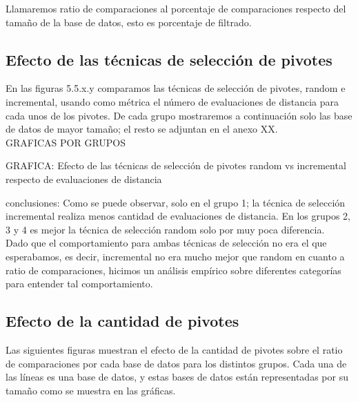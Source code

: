Llamaremos ratio de comparaciones al porcentaje de comparaciones respecto del tamaño de la base de datos, esto es porcentaje de filtrado.\\

\subsection{Efecto de las t\'ecnicas de selecci\'on de pivotes}

En las figuras 5.5.x.y comparamos las t\'ecnicas de selecci\'on de pivotes, random e incremental, usando como m\'etrica el n\'umero de evaluaciones de distancia para cada unos de los pivotes. De cada grupo mostraremos a continuaci\'on solo las base de datos de mayor tamaño; el resto se adjuntan en el anexo XX.\\

GRAFICAS POR GRUPOS

 GRAFICA: Efecto de las t\'ecnicas de selecci\'on de pivotes random vs incremental respecto de evaluaciones de distancia
 
 conclusiones:
 Como se puede observar, solo en el grupo 1; la t\'ecnica de selecci\'on incremental realiza menos cantidad de evaluaciones de distancia. En los grupos 2, 3 y 4 es mejor la t\'ecnica de selecci\'on random solo por muy poca diferencia.\\
 
 
Dado que el comportamiento para ambas t\'ecnicas de selecci\'on no era el que esperabamos, es decir, incremental no era mucho mejor que random en cuanto a ratio de comparaciones, hicimos un an\'alisis emp\'irico sobre diferentes categor\'ias para entender tal comportamiento. 

\subsection{Efecto de la cantidad de pivotes}

Las siguientes figuras muestran el efecto de la cantidad de pivotes sobre el ratio de comparaciones por cada base de datos para los distintos grupos. Cada una de las l\'ineas es una base de datos, y estas bases de datos est\'an representadas por su tamaño como se muestra en las gr\'aficas.\\

